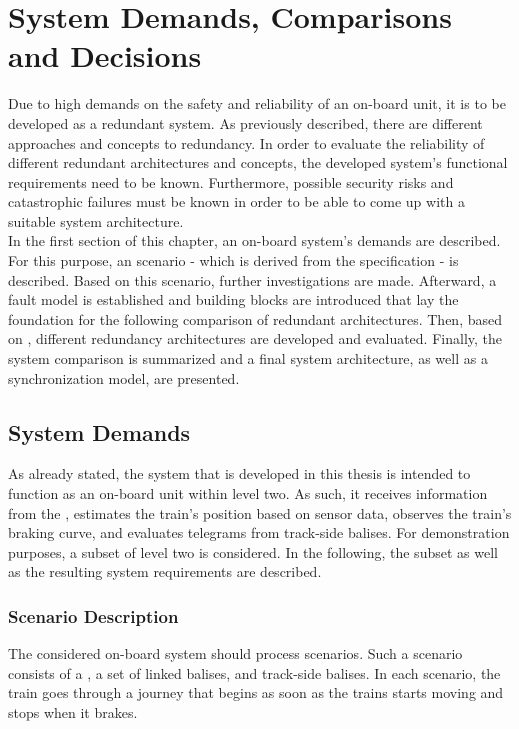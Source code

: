 \chapter{System Demands, Comparisons and Decisions}
\label{chptr:redundantSystemsCompare}
Due to high demands on the safety and reliability of an on-board unit, it is to be developed as a redundant system.
As previously described, there are different approaches and concepts to redundancy.
In order to evaluate the reliability of different redundant architectures and concepts, the developed system's functional requirements need to be known.
Furthermore, possible security risks and catastrophic failures must be known in order to be able to come up with a suitable system architecture.
\\

In the first section of this chapter, an  on-board system's demands are described.
For this purpose, an  scenario - which is derived from the  specification - is described.
Based on this scenario, further investigations are made.
Afterward, a fault model is established and  building blocks are introduced that lay the foundation for the following comparison of redundant architectures.
Then, based on , different redundancy architectures are developed and evaluated.
Finally, the system comparison is summarized and a final system architecture, as well as a synchronization model, are presented.

\section{System Demands}
As already stated, the system that is developed in this thesis is intended to function as an on-board unit within  level two.
As such, it receives information from the , estimates the train's position based on sensor data, observes the train's braking curve, and evaluates telegrams from track-side balises.
For demonstration purposes, a subset of  level two is considered.
In the following, the  subset as well as the resulting system requirements are described.

\subsection{Scenario Description}
\label{sec:ScenarioDescription}

The considered on-board system should process  scenarios.
Such a scenario consists of a , a set of linked balises, and track-side balises.
In each scenario, the train goes through a journey that begins as soon as the trains starts moving and stops when it brakes.
\\


